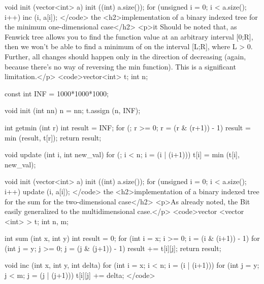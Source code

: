 void init (vector<int> a)
{
init ((int) a.size());
for (unsigned i = 0; i < a.size(); i++)
inc (i, a[i]);
}</code>
the <h2>implementation of a binary indexed tree for the minimum one-dimensional case</h2>
<p>it Should be noted that, as Fenwick tree allows you to find the function value at an arbitrary interval [0;R], then we won't be able to find a minimum of on the interval [L;R], where L > 0. Further, all changes should happen only in the direction of decreasing (again, because there's no way of reversing the min function). This is a significant limitation.</p>
<code>vector<int> t;
int n;

const int INF = 1000*1000*1000;

void init (int nn)
{
n = nn;
t.assign (n, INF);
}

int getmin (int r)
{
int result = INF;
for (; r >= 0; r = (r & (r+1)) - 1)
result = min (result, t[r]);
return result;
}

void update (int i, int new_val)
{
for (; i < n; i = (i | (i+1)))
t[i] = min (t[i], new_val);
}

void init (vector<int> a)
{
init ((int) a.size());
for (unsigned i = 0; i < a.size(); i++)
update (i, a[i]);
}</code>
the <h2>implementation of a binary indexed tree for the sum for the two-dimensional case</h2>
<p>As already noted, the Bit easily generalized to the multidimensional case.</p>
<code>vector <vector <int> > t;
int n, m;

int sum (int x, int y)
{
int result = 0;
for (int i = x; i >= 0; i = (i & (i+1)) - 1)
for (int j = y; j >= 0; j = (j & (j+1)) - 1)
result += t[i][j];
return result;
}

void inc (int x, int y, int delta)
{
for (int i = x; i < n; i = (i | (i+1)))
for (int j = y; j < m; j = (j | (j+1)))
t[i][j] += delta;
}</code>